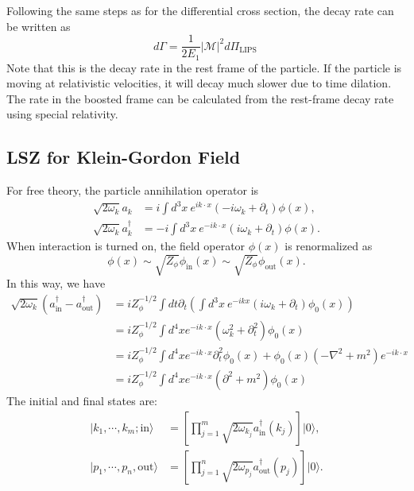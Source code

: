 Following the same steps as for the differential cross section, the decay rate can be written as
\begin{equation}
	d \Gamma=\frac{1}{2 E_{1}}|\mathcal{M}|^{2} d \Pi_{\text {LIPS }}
\end{equation}
Note that this is the decay rate in the rest frame of the particle. 
If the particle is moving at relativistic velocities, it will decay much slower due to time dilation. 
The rate in the boosted frame can be calculated from the rest-frame decay rate using special relativity.




\subsection{LSZ for Klein-Gordon Field}
For free theory, the particle annihilation operator is
\begin{equation}
\begin{aligned}
	\sqrt{2\omega_k} a_k &= i \int d^3 x\ e^{ik\cdot x}(-i\omega_k+\partial_t)\phi(x), \\
	\sqrt{2\omega_k} a^\dagger_k &= -i \int d^3 x\ e^{-ik\cdot x}(i\omega_k+\partial_t)\phi(x).
\end{aligned}
\end{equation}
When interaction is turned on, the field operator $\phi(x)$ is renormalized as
\begin{equation*}
	\phi(x) \sim \sqrt{Z_{\phi}} \phi_{\mathrm{in}}(x) \sim \sqrt{Z_{\phi}} \phi_{\mathrm{out}}(x).
\end{equation*}
In this way, we have
\begin{equation*}
\begin{aligned}
	\sqrt{2\omega_k}(a_{\mathrm{in}}^\dagger - a_{\mathrm{out}}^\dagger)
	&= i Z_\phi^{-1/2} \int dt \partial_t \left(\int d^{3}x\ e^{-ikx}(i\omega_k+\partial_t)\phi_0(x)\right) \\
	&= i Z_\phi^{-1/2} \int d^4 x e^{-ik\cdot x}(\omega_k^2+\partial_t^2)\phi_0(x) \\
	&= i Z_\phi^{-1/2} \int d^4 x e^{-ik\cdot x}\partial_t^2\phi_0(x) + \phi_0(x)(-\nabla^2+m^2)e^{-i k\cdot x} \\
	&= i Z_\phi^{-1/2} \int d^4 x e^{-ik\cdot x}(\partial^2+m^2)\phi_0(x)
\end{aligned}
\end{equation*}
The initial and final states are:
\begin{equation}
\begin{aligned}
	|k_1, \cdots, k_m; \mathrm{in}\rangle &= \left[\prod_{j=1}^m \sqrt{2\omega_{k_j}} a^\dagger_{\mathrm{in}}(k_j)\right] |0\rangle, \\
	|p_1, \cdots, p_n, \mathrm{out}\rangle &= \left[\prod_{j=1}^n \sqrt{2\omega_{p_j}}a^\dagger_{\mathrm{out}}(p_j)\right] |0\rangle.
\end{aligned}
\end{equation}
